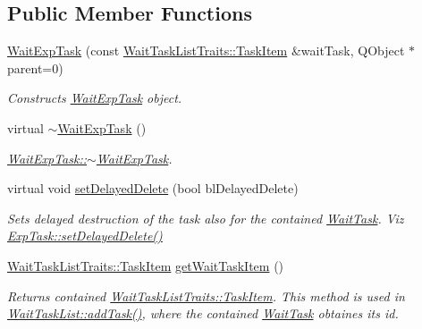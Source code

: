 \subsection*{Public Member Functions}
\begin{DoxyCompactItemize}
\item 
\hypertarget{class_wait_exp_task_a15d7409a0fdc6c6da419ad9959c86e71}{}\hyperlink{class_wait_exp_task_a15d7409a0fdc6c6da419ad9959c86e71}{Wait\+Exp\+Task} (const \hyperlink{struct_wait_task_list_traits_1_1_task_item}{Wait\+Task\+List\+Traits\+::\+Task\+Item} \&wait\+Task, Q\+Object $\ast$parent=0)\label{class_wait_exp_task_a15d7409a0fdc6c6da419ad9959c86e71}

\begin{DoxyCompactList}\small\item\em Constructs \hyperlink{class_wait_exp_task}{Wait\+Exp\+Task} object. \end{DoxyCompactList}\item 
\hypertarget{class_wait_exp_task_a8688827b3a1eccec11bdd5d7002ee288}{}virtual \hyperlink{class_wait_exp_task_a8688827b3a1eccec11bdd5d7002ee288}{$\sim$\+Wait\+Exp\+Task} ()\label{class_wait_exp_task_a8688827b3a1eccec11bdd5d7002ee288}

\begin{DoxyCompactList}\small\item\em \hyperlink{class_wait_exp_task_a8688827b3a1eccec11bdd5d7002ee288}{Wait\+Exp\+Task\+::$\sim$\+Wait\+Exp\+Task}. \end{DoxyCompactList}\item 
\hypertarget{class_wait_exp_task_a34d831c5c3497c9e315a5323e9e45b02}{}virtual void \hyperlink{class_wait_exp_task_a34d831c5c3497c9e315a5323e9e45b02}{set\+Delayed\+Delete} (bool bl\+Delayed\+Delete)\label{class_wait_exp_task_a34d831c5c3497c9e315a5323e9e45b02}

\begin{DoxyCompactList}\small\item\em Sets delayed destruction of the task also for the contained \hyperlink{class_wait_task}{Wait\+Task}. Viz \hyperlink{class_exp_task_a2049ca37582a4b3250f3fc46ba19fe2a}{Exp\+Task\+::set\+Delayed\+Delete()} \end{DoxyCompactList}\item 
\hypertarget{class_wait_exp_task_ae9c89cd3011fe082c884fef466317291}{}\hyperlink{struct_wait_task_list_traits_1_1_task_item}{Wait\+Task\+List\+Traits\+::\+Task\+Item} \hyperlink{class_wait_exp_task_ae9c89cd3011fe082c884fef466317291}{get\+Wait\+Task\+Item} ()\label{class_wait_exp_task_ae9c89cd3011fe082c884fef466317291}

\begin{DoxyCompactList}\small\item\em Returns contained \hyperlink{struct_wait_task_list_traits_1_1_task_item}{Wait\+Task\+List\+Traits\+::\+Task\+Item}. This method is used in \hyperlink{class_wait_task_list_a429d0b45f82a2eef00c5dacffbbc1f70}{Wait\+Task\+List\+::add\+Task()}, where the contained \hyperlink{class_wait_task}{Wait\+Task} obtaines its id. \end{DoxyCompactList}\end{DoxyCompactItemize}
